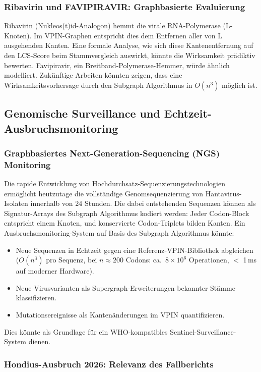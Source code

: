 ﻿\documentclass[a4paper,12pt]{article}
\theoremstyle{definition}
\begin{document}
\subsubsection{Ribavirin und FAVIPIRAVIR: Graphbasierte Evaluierung}

Ribavirin (Nukleos(t)id-Analogon) hemmt die virale RNA-Polymerase (L-Knoten).
Im VPIN-Graphen entspricht dies dem Entfernen aller von L ausgehenden Kanten.
Eine formale Analyse, wie sich diese Kantenentfernung auf den LCS-Score
beim Stammvergleich auswirkt, k\"onnte die Wirksamkeit pr\"adiktiv bewerten.
Favipiravir, ein Breitband-Polymerase-Hemmer, w\"urde \"ahnlich modelliert.
Zuk\"unftige Arbeiten k\"onnten zeigen, dass eine Wirksamkeitsvorhersage
durch den Subgraph Algorithmus in $O(n^3)$ m\"oglich ist.

\subsection{Genomische Surveillance und Echtzeit-Ausbruchsmonitoring}

\subsubsection{Graphbasiertes Next-Generation-Sequencing (NGS) Monitoring}

Die rapide Entwicklung von Hochdurchsatz-Sequenzierungstechnologien
erm\"oglicht heutzutage die vollst\"andige Genomsequenzierung von
Hantavirus-Isolaten innerhalb von 24 Stunden. Die dabei entstehenden
Sequenzen k\"onnen als Signatur-Arrays des Subgraph Algorithmus kodiert
werden: Jeder Codon-Block entspricht einem Knoten, und konservierte
Codon-Triplets bilden Kanten. Ein Ausbruchsmonitoring-System auf Basis
des Subgraph Algorithmus k\"onnte:
\begin{itemize}
    \item Neue Sequenzen in Echtzeit gegen eine Referenz-VPIN-Bibliothek
          abgleichen ($O(n^3)$ pro Sequenz, bei $n \approx 200$ Codons:
          ca.\ $8 \times 10^6$ Operationen, $<$ 1\,ms auf moderner Hardware).
    \item Neue Virusvarianten als Supergraph-Erweiterungen bekannter St\"amme
          klassifizieren.
    \item Mutationsereignisse als Kanten\"anderungen im VPIN quantifizieren.
\end{itemize}
Dies k\"onnte als Grundlage f\"ur ein WHO-kompatibles Sentinel-Surveillance-System
dienen.

\subsubsection{Hondius-Ausbruch 2026: Relevanz des Fallberichts}
\end{document}
